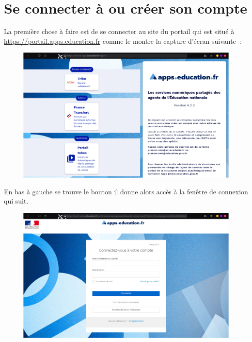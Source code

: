 \chapter{Se connecter à ou créer son compte}

La première chose à faire est de se connecter au site du portail qui est situé à \url{https://portail.apps.education.fr} comme le montre la capture d'écran suivante~:
\begin{figure}
    \centering
    \includegraphics{Captures/portail.site.web.png}
\end{figure}

En bas à gauche se trouve le bouton  il donne alors accès à la fenêtre de connexion qui suit. 
\begin{figure}
	\centering
	\includegraphics{./Captures/portail.site.web.connexion.png}
\end{figure}

